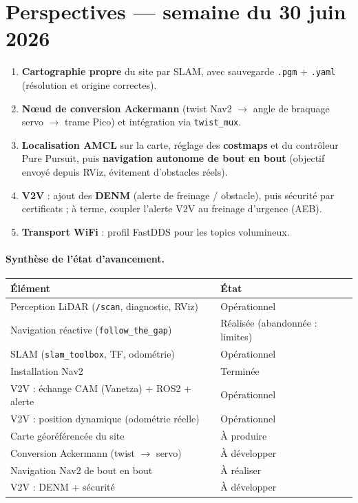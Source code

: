 \documentclass[a4paper,11pt]{article}
\begin{document}
\section{Perspectives --- semaine du 30 juin 2026}
\begin{enumerate}[leftmargin=1.6em]
  \item \textbf{Cartographie propre} du site par SLAM, avec sauvegarde \texttt{.pgm}
        + \texttt{.yaml} (résolution et origine correctes).
  \item \textbf{N{\oe}ud de conversion Ackermann} (twist Nav2 $\rightarrow$ angle de
        braquage servo $\rightarrow$ trame Pico) et intégration via \texttt{twist\_mux}.
  \item \textbf{Localisation AMCL} sur la carte, réglage des \textbf{costmaps} et du
        contrôleur Pure Pursuit, puis \textbf{navigation autonome de bout en bout}
        (objectif envoyé depuis RViz, évitement d'obstacles réels).
  \item \textbf{V2V} : ajout des \textbf{DENM} (alerte de freinage / obstacle),
        puis sécurité par certificats ; à terme, coupler l'alerte V2V au freinage
        d'urgence (AEB).
  \item \textbf{Transport WiFi} : profil FastDDS pour les topics volumineux.
\end{enumerate}

\paragraph{Synthèse de l'état d'avancement.}
\begin{center}
\begin{tabularx}{\textwidth}{@{}X l@{}}
\toprule
\textbf{Élément} & \textbf{État} \\
\midrule
Perception LiDAR (\texttt{/scan}, diagnostic, RViz) & \textcolor{success}{Opérationnel} \\
Navigation réactive (\texttt{follow\_the\_gap}) & \textcolor{success}{Réalisée} (abandonnée : limites) \\
SLAM (\texttt{slam\_toolbox}, TF, odométrie) & \textcolor{success}{Opérationnel} \\
Installation Nav2 & \textcolor{success}{Terminée} \\
V2V : échange CAM (Vanetza) + ROS2 + alerte & \textcolor{success}{Opérationnel} \\
V2V : position dynamique (odométrie réelle) & \textcolor{success}{Opérationnel} \\
Carte géoréférencée du site & \textcolor{warning}{À produire} \\
Conversion Ackermann (twist $\rightarrow$ servo) & \textcolor{warning}{À développer} \\
Navigation Nav2 de bout en bout & \textcolor{warning}{À réaliser} \\
V2V : DENM + sécurité & \textcolor{warning}{À développer} \\
\bottomrule
\end{tabularx}
\end{center}
\end{document}
